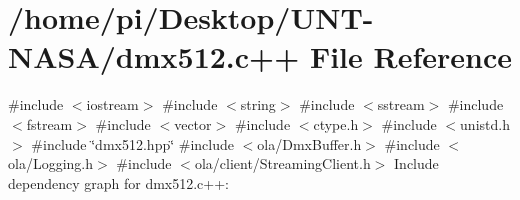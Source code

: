 \hypertarget{dmx512_8c_09_09}{}\section{/home/pi/\+Desktop/\+U\+N\+T-\/\+N\+A\+S\+A/dmx512.c++ File Reference}
\label{dmx512_8c_09_09}
{\ttfamily \#include $<$iostream$>$}\newline
{\ttfamily \#include $<$string$>$}\newline
{\ttfamily \#include $<$sstream$>$}\newline
{\ttfamily \#include $<$fstream$>$}\newline
{\ttfamily \#include $<$vector$>$}\newline
{\ttfamily \#include $<$ctype.\+h$>$}\newline
{\ttfamily \#include $<$unistd.\+h$>$}\newline
{\ttfamily \#include \char`\"{}dmx512.\+hpp\char`\"{}}\newline
{\ttfamily \#include $<$ola/\+Dmx\+Buffer.\+h$>$}\newline
{\ttfamily \#include $<$ola/\+Logging.\+h$>$}\newline
{\ttfamily \#include $<$ola/client/\+Streaming\+Client.\+h$>$}\newline
Include dependency graph for dmx512.\+c++\+:
